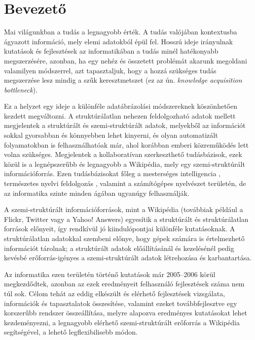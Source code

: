 
\chapter*{Bevezető}
\label{cha:intro}

Mai világunkban a tudás a legnagyobb érték. A tudás valójában kontextusba ágyazott információ, mely elemi adatokból épül fel. Hosszú ideje irányulnak kutatások és fejlesztések az informatikában a tudás minél hatékonyabb megszerzésére, azonban, ha egy nehéz és összetett problémát akarunk megoldani valamilyen módszerrel, azt tapasztaljuk, hogy a hozzá szükséges tudás megszerzése lesz mindig a szűk keresztmetszet (ez az ún. \textit{knowledge acquisition bottleneck}).

Ez a helyzet egy ideje a különféle adatábrázolási módszereknek köszönhetően kezdett megváltozni. A struktúrálatlan nehezen feldolgozható adatok mellett megjelentek a struktúrált és szemi-struktúrált adatok, melyekből az információt sokkal gyorsabban és könnyebben lehet kinyerni, és olyan automatizált folyamatokban is felhasználhatóak már, ahol korábban emberi közreműködés lett volna szükséges. Megjelentek a kollaboratívan szerkeszthető tudásbázisok, ezek közül is a legnépszerűbb és legnagyobb a Wikipédia, mely egy szemi-struktúrált információforrás. Ezen tudásbázisokat főleg a mesterséges intelligencia \cite{aijournal}, természetes nyelvi feldolgozás \cite{sciborg}, valamint a számítógépes nyelvészet területén, de az informatika szinte minden ágában ugyanúgy felhasználják.

A szemi-struktúrált információforrások, mint a Wikipédia (továbbiak például a Flickr, Twitter vagy a Yahoo! Answers) egyesítik a struktúrált és struktúrálatlan források előnyeit, így rendkívül jó kiindulópontjai különféle kutatásoknak. A struktúrálatlan adatokkal szembeni előnye, hogy gépek számára is értelmezhető információt tárolnak; a struktúrált adatok előállításánál és kezelésénél pedig kevésbé erőforrás-igényes a szemi-struktúrált adatok létrehozása és karbantartása.

Az informatika ezen területén történő kutatások már 2005--2006 körül megkezdődtek, azonban az ezek eredményeit felhasználó fejlesztések száma nem túl sok. Célom tehát az eddig elkészült és elérhető fejlesztések vizsgálata, információk és tapasztalatok összesítése, valamint ezeket továbbfejlesztve egy korszerűbb rendszer összeállítása, melyre alapozva eredményes kutatásokat lehet kezdeményezni, a legnagyobb elérhető szemi-struktúrált erőforrás a Wikipédia segítségével, a lehető legflexibilisebb módon.

